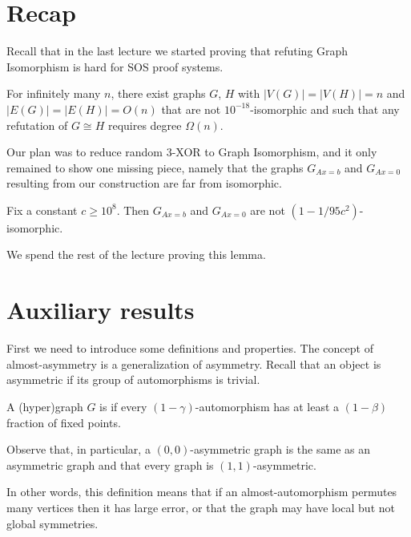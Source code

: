 \documentclass[a4paper,twoside,justified]{tufte-handout}
\newcommand{\PS}{\proofsystem{PC$_>$}}
\newcommand{\Glin}[1]{G_{Ax=#1}}
\begin{document}
 

\section{Recap}

Recall that in the last lecture we started proving that refuting Graph Isomorphism is hard for SOS proof systems.

\begin{theorem}\cite{robustgraphiso}
  \label{th:gi-ps}
  For infinitely many $n$, there exist graphs $G$, $H$ with $|V(G)|=|V(H)|=n$ and $|E(G)|=|E(H)|=O(n)$ that are not $10^{-18}$-isomorphic and such that any \PS refutation of $G \cong H$ requires degree $\Omega(n)$.
\end{theorem}

Our plan was to reduce random 3-XOR to Graph Isomorphism, and it only remained to show one missing piece, namely that the graphs $\Glin{b}$ and $\Glin{0}$ resulting from our construction are far from isomorphic.

\begin{lemma}
  \label{lem:non-isomorphic}
  Fix a constant $c \geq 10^8$. Then \whp $\Glin{b}$ and $\Glin{0}$ are not $(1-1/95c^2)$-isomorphic.
\end{lemma}

We spend the rest of the lecture proving this lemma.

\section{Auxiliary results}

First we need to introduce some definitions and properties. The concept of almost-asymmetry is a generalization of asymmetry. Recall that an object is asymmetric if its group of automorphisms is trivial.

\begin{definition}
  \label{def:asymmetry} A (hyper)graph $G$ is  if 
every
$(1-\gamma)$-automorphism has at least a $(1-\beta)$ fraction of fixed points.
\end{definition}

Observe that, in particular, a $(0,0)$-asymmetric graph is the same as an asymmetric graph and that every graph is 
$(1, 1)$-asymmetric.

In other words, this definition means that if an almost-automorphism permutes many vertices then it has large error, or that the graph may have local but not global symmetries.
\end{document}
